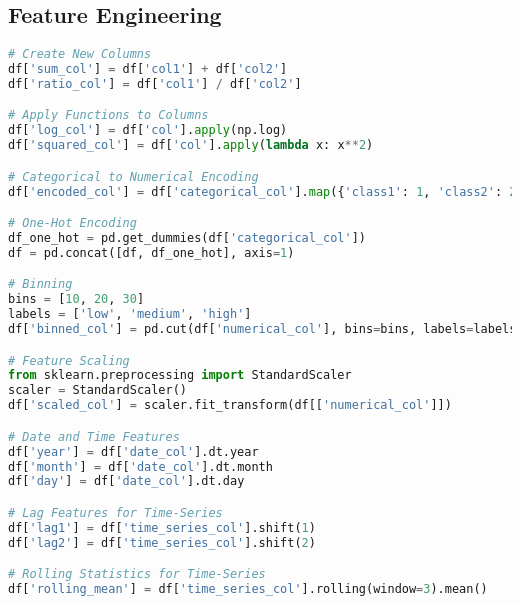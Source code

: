 \documentclass[english, threecolumn]{latex4ei/latex4ei_sheet}
\begin{document}
\begin{sectionbox}
\subsection{Feature Engineering}
\begin{lstlisting}[language=Python, gobble=0]
# Create New Columns
df['sum_col'] = df['col1'] + df['col2']
df['ratio_col'] = df['col1'] / df['col2']

# Apply Functions to Columns
df['log_col'] = df['col'].apply(np.log)
df['squared_col'] = df['col'].apply(lambda x: x**2)

# Categorical to Numerical Encoding
df['encoded_col'] = df['categorical_col'].map({'class1': 1, 'class2': 2})

# One-Hot Encoding
df_one_hot = pd.get_dummies(df['categorical_col'])
df = pd.concat([df, df_one_hot], axis=1)

# Binning
bins = [10, 20, 30]
labels = ['low', 'medium', 'high']
df['binned_col'] = pd.cut(df['numerical_col'], bins=bins, labels=labels)

# Feature Scaling
from sklearn.preprocessing import StandardScaler
scaler = StandardScaler()
df['scaled_col'] = scaler.fit_transform(df[['numerical_col']])

# Date and Time Features
df['year'] = df['date_col'].dt.year
df['month'] = df['date_col'].dt.month
df['day'] = df['date_col'].dt.day

# Lag Features for Time-Series
df['lag1'] = df['time_series_col'].shift(1)
df['lag2'] = df['time_series_col'].shift(2)

# Rolling Statistics for Time-Series
df['rolling_mean'] = df['time_series_col'].rolling(window=3).mean()

\end{lstlisting}
\end{sectionbox}
\end{document}
